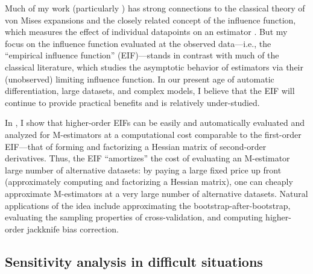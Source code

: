 Much of my work (particularly \citet{giordano:2019:ij, giordano:2020:amip,
giordano:2021:bayesij}) has strong connections to the classical theory of von
Mises expansions and the closely related concept of the influence function,
which measures the effect of individual datapoints on an estimator
\citep{mises:1947:asymptotic, reeds:1976:thesis, hampel:1986:robustbook,
serfling:2009:approximation}.  But my focus on the influence function
evaluated at the observed data---i.e., the ``empirical influence function''
(EIF)---stands in contrast with much of the classical literature, which studies
the asymptotic behavior of estimators via their (unobserved) limiting influence
function.
%
In our present age of automatic differentiation, large datasets, and complex
models, I believe that the EIF will continue to provide practical benefits and
is relatively under-studied.

In \citet{giordano:2019:hoij}, I show that higher-order EIFs can be
easily and automatically evaluated and analyzed for M-estimators at a
computational cost comparable to the first-order EIF---that of forming and
factorizing a Hessian matrix of second-order derivatives.
%
Thus, the EIF ``amortizes'' the cost of evaluating an M-estimator large number
of alternative datasets: by paying a large fixed price up front (approximately
computing and factorizing a Hessian matrix), one can cheaply approximate
M-estimators at a very large number of alternative datasets.  Natural
applications of the idea include approximating the bootstrap-after-bootstrap,
evaluating the sampling properties of cross-validation, and computing
higher-order jackknife bias correction.

\subsection{Sensitivity analysis in difficult situations}

